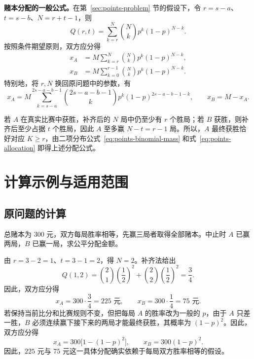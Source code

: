 \documentclass[UTF8]{ctexart}
\begin{document}
\textbf{赌本分配的一般公式。}在第~\ref{sec:points-problem} 节的假设下，令 $r=s-a$、$t=s-b$、$N=r+t-1$，则
\begin{equation}
  Q(r,t)=\sum_{k=r}^{N}\binom Nk p^k(1-p)^{N-k}.
  \label{eq:points-binomial-tail}
\end{equation}
按照条件期望原则，双方应分得
\begin{equation}
  \boxed{
  \begin{aligned}
    x_A&=M\sum_{k=r}^{N}\binom Nk p^k(1-p)^{N-k},\\
    x_B&=M\sum_{k=0}^{r-1}\binom Nk p^k(1-p)^{N-k}.
  \end{aligned}}
  \label{eq:points-general-shares}
\end{equation}
特别地，将 $r,N$ 换回原问题中的参数，有
\begin{equation}
  x_A=M\sum_{k=s-a}^{2s-a-b-1}
    \binom{2s-a-b-1}{k}p^k(1-p)^{2s-a-b-1-k},
  \qquad x_B=M-x_A.
  \label{eq:points-original-parameters}
\end{equation}

若 $A$ 在真实比赛中获胜，补齐后的 $N$ 局中仍至少有 $r$ 个胜局；若 $B$ 获胜，则补齐后至少占据 $t$ 个胜局，因此 $A$ 至多赢 $N-t=r-1$ 局。所以，$A$ 最终获胜恰好对应 $K\ge r$，由二项分布公式~\eqref{eq:points-binomial-mass} 和式~\eqref{eq:points-allocation} 即得上述分配公式。

\section{计算示例与适用范围}
\label{sec:points-examples}

\subsection{原问题的计算}

\begin{example}
\label{ex:points-original}
总赌本为 $300$ 元，双方每局胜率相等，先赢三局者取得全部赌本。中止时 $A$ 已赢两局，$B$ 已赢一局，求公平分配金额。
\end{example}

\begin{solve}
由 $r=3-2=1$、$t=3-1=2$，得 $N=2$。补齐法给出
\[
  Q(1,2)=\binom21\left(\frac12\right)^2
          +\binom22\left(\frac12\right)^2
        =\frac34.
\]
因此，双方应分得
\[
  x_A=300\cdot\frac34=225\text{ 元},\qquad
  x_B=300\cdot\frac14=75\text{ 元}.
\]
若保持当前比分和比赛规则不变，但把每局 $A$ 的胜率改为一般的 $p$，由于 $A$ 只差一胜，$B$ 必须连续赢下接下来的两局才能最终获胜，其概率为 $(1-p)^2$。因此，双方应分得
\[
  x_A=300\bigl[1-(1-p)^2\bigr],\qquad x_B=300(1-p)^2.
\]
因此，$225$ 元与 $75$ 元这一具体分配确实依赖于每局双方胜率相等的假设。
\end{solve}
\end{document}
